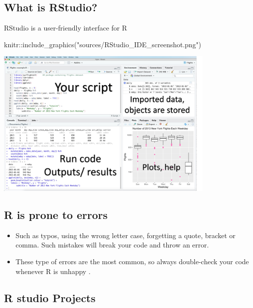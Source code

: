 \documentclass[
  letterpaper,
  DIV=11,
  numbers=noendperiod,
  oneside]{scrartcl}
\newenvironment{Shaded}{\begin{snugshade}}{\end{snugshade}}
\newcommand{\FunctionTok}[1]{\textcolor[rgb]{0.28,0.35,0.67}{#1}}
\newcommand{\NormalTok}[1]{\textcolor[rgb]{0.00,0.23,0.31}{#1}}
\newcommand{\SpecialCharTok}[1]{\textcolor[rgb]{0.37,0.37,0.37}{#1}}
\newcommand{\StringTok}[1]{\textcolor[rgb]{0.13,0.47,0.30}{#1}}
\begin{document}
\subsection{What is RStudio?}\label{what-is-rstudio}

RStudio is a user-friendly interface for R

\begin{Shaded}
\begin{Highlighting}[]
\NormalTok{knitr}\SpecialCharTok{::}\FunctionTok{include\_graphics}\NormalTok{(}\StringTok{"sources/RStudio\_IDE\_screenshot.png"}\NormalTok{)}
\end{Highlighting}
\end{Shaded}

\includegraphics[width=0.8\textwidth,height=\textheight]{sources/RStudio_IDE_screenshot.png}

\subsection{R is prone to errors}\label{r-is-prone-to-errors}

\begin{itemize}
\item
   Such as typos, using the wrong letter case, forgetting a
  quote, bracket or comma. Such mistakes will break your code and throw
  an error.
\item
   These type of errors are the most common,
  so always double-check your code whenever R is unhappy
  .
\end{itemize}

\subsection{R studio Projects}\label{r-studio-projects}
\end{document}
